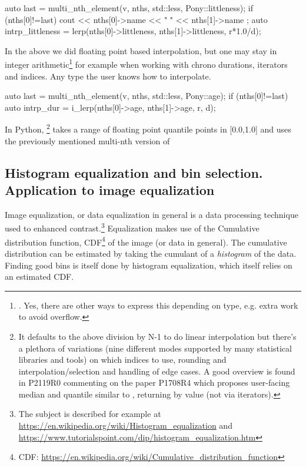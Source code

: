 \begin{codeblock}
auto last = multi_nth_element(v, nths, std::less{}, Pony::littleness);
if (nths[0]!=last){
  cout << nths[0]->name << " " << nths[1]->name ; 
  auto intrp_littleness = lerp(nths[0]->littleness, nths[1]->littleness, r*1.0/d);
}
\end{codeblock}

In the above we did floating point based interpolation, but 
one may stay in integer arithmetic\footnote{. Yes, there are other ways to express this depending on type, e.g. extra work to avoid overflow.}
 for example when working with chrono durations, iterators and indices. Any type the user knows how to interpolate.

 
\begin{codeblock}
auto last = multi_nth_element(v, nths, std::less{}, Pony::age);
if (nths[0]!=last){
  auto intrp_dur = i_lerp(nths[0]->age, nths[1]->age, r, d);
}
\end{codeblock}
\label{quantileanything}

In Python, %
\footnote{
It defaults to the above division by N-1 to do linear interpolation but there's a plethora of variations (nine different modes supported by many statistical libraries and tools) on which indices to use, rounding and interpolation/\mbox{selection} and handling of edge cases. 
A good overview is found in P2119R0 commenting on the paper P1708R4  which proposes user-facing median and quantile similar to , returning by value (not via iterators).}
 takes a range of floating point quantile points in [0.0,1.0] and uses the previously mentioned multi-nth version of %

\newpage

\subsection{Histogram equalization and bin selection. Application to image equalization} 

Image equalization, or data equalization in general is a data processing technique used to enhanced contrast.\footnote{
The subject is described for example at \url{https://en.wikipedia.org/wiki/Histogram_equalization} and \url{https://www.tutorialspoint.com/dip/histogram_equalization.htm}} 
Equalization makes use of the Cumulative distribution function, CDF\footnote{CDF: \url{https://en.wikipedia.org/wiki/Cumulative_distribution_function}} of the image (or data in general). The cumulative distribution can be estimated by taking the cumulant of a \emph{histogram} of the data. Finding good bins is itself done by histogram equalization, which itself relies on an estimated CDF.

